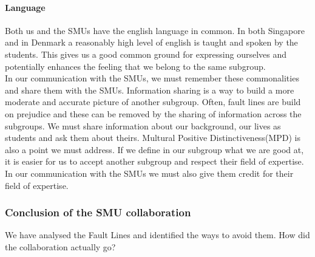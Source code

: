 \documentclass[a4paper,11pt,report]{article}
\begin{document}
{\paragraph{Language}
Both us and the SMUs have the english language in common. In both Singapore and in Denmark a reasonably high level of english is taught and spoken by the students. This gives us a good common ground for expressing ourselves and potentially enhances the feeling that we belong to the same subgroup. \\

In our communication with the SMUs, we must remember these commonalities and share them with the SMUs. Information sharing\cite{smu} is a way to build a more moderate and accurate picture of another subgroup. Often, fault lines are build on prejudice and these can be removed by the sharing of information across the subgroups. We must share information about our background, our lives as students and ask them about theirs. Multural Positive Distinctiveness(MPD)\cite{smu} is also a point we must address. If we define in our subgroup what we are good at, it is easier for us to accept another subgroup and respect their field of expertise. In our communication with the SMUs we must also give them credit for their field of expertise. \\

\subsubsection{Conclusion of the SMU collaboration}

We have analysed the Fault Lines and identified the ways to avoid them. How did the collaboration actually go? \\

}
\end{document}
